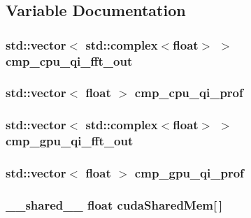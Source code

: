 \subsection{Variable Documentation}
\subsubsection[{\texorpdfstring{cmp\+\_\+cpu\+\_\+qi\+\_\+fft\+\_\+out}{cmp_cpu_qi_fft_out}}]{\setlength{\rightskip}{0pt plus 5cm}std\+::vector$<$ std\+::complex$<$float$>$ $>$ cmp\+\_\+cpu\+\_\+qi\+\_\+fft\+\_\+out}\hypertarget{test_8cu_a9d2895908a386c1f380b8085f1e28340}{}\label{test_8cu_a9d2895908a386c1f380b8085f1e28340}
\subsubsection[{\texorpdfstring{cmp\+\_\+cpu\+\_\+qi\+\_\+prof}{cmp_cpu_qi_prof}}]{\setlength{\rightskip}{0pt plus 5cm}std\+::vector$<$ float $>$ cmp\+\_\+cpu\+\_\+qi\+\_\+prof}\hypertarget{test_8cu_a4504c3c7ffae71a4f843424dd228b123}{}\label{test_8cu_a4504c3c7ffae71a4f843424dd228b123}
\subsubsection[{\texorpdfstring{cmp\+\_\+gpu\+\_\+qi\+\_\+fft\+\_\+out}{cmp_gpu_qi_fft_out}}]{\setlength{\rightskip}{0pt plus 5cm}std\+::vector$<$ std\+::complex$<$float$>$ $>$ cmp\+\_\+gpu\+\_\+qi\+\_\+fft\+\_\+out}\hypertarget{test_8cu_a968a1f45bfd391f01eaee72d1ba61237}{}\label{test_8cu_a968a1f45bfd391f01eaee72d1ba61237}
\subsubsection[{\texorpdfstring{cmp\+\_\+gpu\+\_\+qi\+\_\+prof}{cmp_gpu_qi_prof}}]{\setlength{\rightskip}{0pt plus 5cm}std\+::vector$<$ float $>$ cmp\+\_\+gpu\+\_\+qi\+\_\+prof}\hypertarget{test_8cu_a0f78dfbff0fc38f749d5a83cf7293b89}{}\label{test_8cu_a0f78dfbff0fc38f749d5a83cf7293b89}
\subsubsection[{\texorpdfstring{cuda\+Shared\+Mem}{cudaSharedMem}}]{\setlength{\rightskip}{0pt plus 5cm}\+\_\+\+\_\+shared\+\_\+\+\_\+ float cuda\+Shared\+Mem\mbox{[}$\,$\mbox{]}}\hypertarget{test_8cu_a0b31a228ca14964b01076fffd9d3b201}{}\label{test_8cu_a0b31a228ca14964b01076fffd9d3b201}
